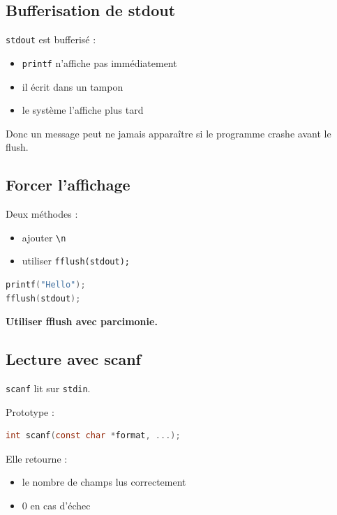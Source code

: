 \subsection{Bufferisation de stdout}

\texttt{stdout} est bufferisé :

\begin{itemize}
    \item \texttt{printf} n’affiche pas immédiatement
    \item il écrit dans un tampon
    \item le système l’affiche plus tard
\end{itemize}

Donc un message peut ne jamais apparaître si le programme
crashe avant le flush.

\subsection{Forcer l’affichage}

Deux méthodes :

\begin{itemize}
    \item ajouter \texttt{\textbackslash n}
    \item utiliser \texttt{fflush(stdout);}
\end{itemize}

\begin{lstlisting}[language=C]
printf("Hello");
fflush(stdout);
\end{lstlisting}

\textbf{Utiliser fflush avec parcimonie.}

\subsection{Lecture avec scanf}

\texttt{scanf} lit sur \texttt{stdin}.

Prototype :

\begin{lstlisting}[language=C]
int scanf(const char *format, ...);
\end{lstlisting}

Elle retourne :

\begin{itemize}
    \item le nombre de champs lus correctement
    \item 0 en cas d’échec
\end{itemize}

